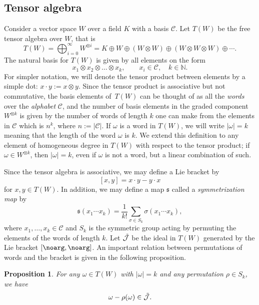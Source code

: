 \documentclass[pdftex]{sigma}
\numberwithin{equation}{section}
\newtheorem{Proposition}[Theorem]{Proposition}
 { \theoremstyle{definition}
\newtheorem{Definition}[Theorem]{Definition}
\newtheorem{Note}[Theorem]{Note}
\newtheorem{Example}[Theorem]{Example}
\newtheorem{Remark}[Theorem]{Remark} }
\begin{document}
\subsection{Tensor algebra}\label{sec:tensor}

Consider a vector space $W$ over a field $K$ with a basis $\mathcal{C}$. Let $T(W)$ be the free tensor algebra over $W$, that is
\[
T(W) = \bigoplus_{i=0}^{\infty} W^{\otimes i} = K \oplus W \oplus (W \otimes W) \oplus (W \otimes W \otimes W) \oplus \cdots .
\]
The natural basis for $T(W)$ is given by all elements on the form
\[
x_1 \otimes x_2 \otimes \dots \otimes x_k, \qquad x_i \in \mathcal{C}, \quad k\in \mathbb{N}.
\]
For simpler notation, we will denote the tensor product between elements by a simple dot: $x \cdot y := x \otimes y$. Since the tensor product is associative but not commutative, the basis elements of~$T(W)$ can be thought of as all the \emph{words} over the \emph{alphabet} $\mathcal{C}$, and the number of basis elements in the graded component $W^{\otimes k}$ is given by the number of words of length $k$ one can make from the elements in $\mathcal{C}$ which is $n^k$, where $n:= |\mathcal{C}|$. If $\omega$ is a word in $T(W)$, we will write $|\omega|=k$ meaning that the length of the word $\omega$ is $k$. We extend this definition to any element of homogeneous degree in $T(W)$ with respect to the tensor product; if $\omega \in W^{\otimes k}$, then $|\omega|=k$, even if $\omega$ is not a word, but a linear combination of such.

Since the tensor algebra is associative, we may define a Lie bracket by
\begin{equation}\label{eq:tensor_bracket}
 [x,y] = x\cdot y - y \cdot x
\end{equation}
for $x,y \in T(W)$. In addition, we may define a map $\mathfrak{s}$ called a \emph{symmetrization map} by
\begin{equation*}%
 \mathfrak{s}(x_1 \cdots x_k) = \frac{1}{k!} \sum_{\sigma \in S_k} \sigma(x_1 \cdots x_k),
\end{equation*}
where $x_1, \dots, x_k \in \mathcal{C}$ and $S_k$ is the symmetric group acting by permuting the elements of the words of length $k$. Let $\Tilde{\mathcal{J}}$ be the ideal in $T(W)$ generated by the Lie bracket $[\noarg , \noarg]$. An important relation between permutations of words and the bracket is given in the following proposition.

\begin{Proposition}\label{prop:perm}
 For any $\omega \in T(W)$ with $|\omega| = k$ and any permutation $\rho \in S_k$, we have
 \[
 \omega - \rho(\omega) \in \Tilde{\mathcal{J}}.
 \]
\end{Proposition}
\end{document}
